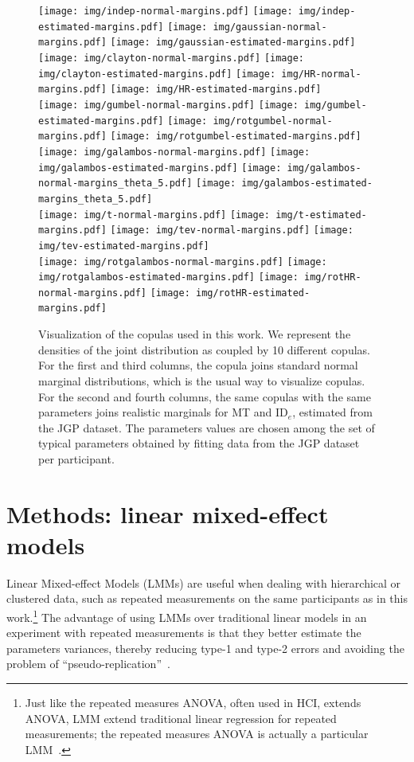 \documentclass[acmlarge, manuscript,review]{acmart}
\begin{document}
\begin{figure}[htbp]
	\centering
	\texttt{[image: img/indep-normal-margins.pdf]}
	\texttt{[image: img/indep-estimated-margins.pdf]}
	\texttt{[image: img/gaussian-normal-margins.pdf]}
	\texttt{[image: img/gaussian-estimated-margins.pdf]}\\
%
	\texttt{[image: img/clayton-normal-margins.pdf]}
	\texttt{[image: img/clayton-estimated-margins.pdf]}
	\texttt{[image: img/HR-normal-margins.pdf]}
	\texttt{[image: img/HR-estimated-margins.pdf]}\\
%
	\texttt{[image: img/gumbel-normal-margins.pdf]}
	\texttt{[image: img/gumbel-estimated-margins.pdf]}
	\texttt{[image: img/rotgumbel-normal-margins.pdf]}
	\texttt{[image: img/rotgumbel-estimated-margins.pdf]}\\
%
	\texttt{[image: img/galambos-normal-margins.pdf]}
	\texttt{[image: img/galambos-estimated-margins.pdf]}
	\texttt{[image: img/galambos-normal-margins\_theta\_5.pdf]}
	\texttt{[image: img/galambos-estimated-margins\_theta\_5.pdf]}\\
	\texttt{[image: img/t-normal-margins.pdf]}
	\texttt{[image: img/t-estimated-margins.pdf]}
	\texttt{[image: img/tev-normal-margins.pdf]}
	\texttt{[image: img/tev-estimated-margins.pdf]}\\
	\texttt{[image: img/rotgalambos-normal-margins.pdf]}
	\texttt{[image: img/rotgalambos-estimated-margins.pdf]}
	\texttt{[image: img/rotHR-normal-margins.pdf]}
	\texttt{[image: img/rotHR-estimated-margins.pdf]}
		
	\caption{Visualization of the copulas used in this work. We represent the densities of the joint distribution as coupled by 10 different copulas. For the first and third columns, the copula joins standard normal marginal distributions, which is the usual way to visualize copulas. For the second and fourth columns, the same copulas with the same parameters joins realistic marginals for MT and ID$_e$, estimated from the JGP dataset. The parameters values are chosen among the set of typical parameters obtained by fitting data from the JGP dataset per participant.}
	\label{fig:copula_visualization}
\end{figure}

\section{Methods: linear mixed-effect models\label{app:lmm}}
Linear Mixed-effect Models (LMMs) are useful when dealing with hierarchical or clustered data, such as repeated measurements on the same participants as in this work\cite{harrison2018}.\footnote{Just like the repeated measures ANOVA, often used in HCI, extends ANOVA, LMM extend traditional linear regression for repeated measurements; the repeated measures ANOVA is actually a particular LMM~\cite{murrar2018}.}
The advantage of using LMMs over traditional linear models in an experiment with repeated measurements is that they better estimate the parameters variances, thereby reducing type-1 and type-2 errors and avoiding the problem of ``pseudo-replication''~\cite{harrison2018}. 
\end{document}

